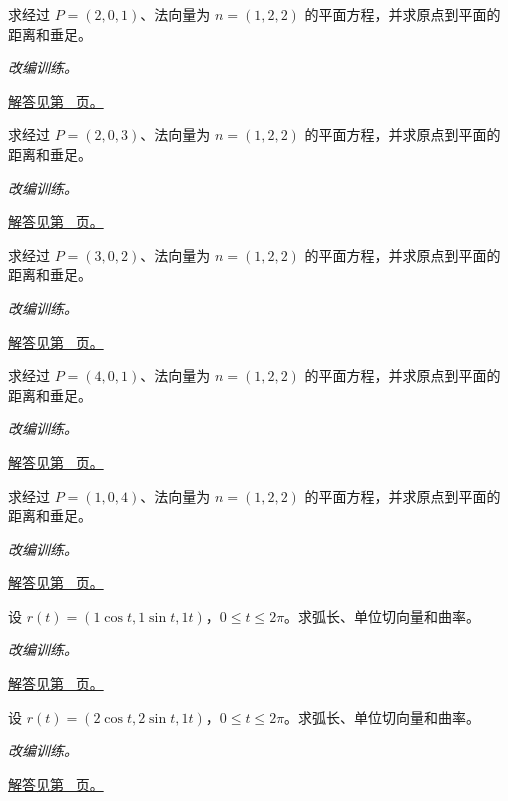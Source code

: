 \documentclass[12pt,fontset=fandol]{ctexart}
\begin{document}
\begin{example}[平面方程与点面距离]\label{ex:c31q8}
求经过 $P=(2,0,1)$、法向量为 $n=(1,2,2)$ 的平面方程，并求原点到平面的距离和垂足。
\par\textit{改编训练。}\par\hyperref[ans:c31q8]{解答见第~\pageref{ans:c31q8} 页。}
\end{example}
\begin{example}[平面方程与点面距离]\label{ex:c31q9}
求经过 $P=(2,0,3)$、法向量为 $n=(1,2,2)$ 的平面方程，并求原点到平面的距离和垂足。
\par\textit{改编训练。}\par\hyperref[ans:c31q9]{解答见第~\pageref{ans:c31q9} 页。}
\end{example}
\begin{example}[平面方程与点面距离]\label{ex:c31q10}
求经过 $P=(3,0,2)$、法向量为 $n=(1,2,2)$ 的平面方程，并求原点到平面的距离和垂足。
\par\textit{改编训练。}\par\hyperref[ans:c31q10]{解答见第~\pageref{ans:c31q10} 页。}
\end{example}
\begin{example}[平面方程与点面距离]\label{ex:c31q11}
求经过 $P=(4,0,1)$、法向量为 $n=(1,2,2)$ 的平面方程，并求原点到平面的距离和垂足。
\par\textit{改编训练。}\par\hyperref[ans:c31q11]{解答见第~\pageref{ans:c31q11} 页。}
\end{example}
\begin{example}[平面方程与点面距离]\label{ex:c31q12}
求经过 $P=(1,0,4)$、法向量为 $n=(1,2,2)$ 的平面方程，并求原点到平面的距离和垂足。
\par\textit{改编训练。}\par\hyperref[ans:c31q12]{解答见第~\pageref{ans:c31q12} 页。}
\end{example}
\begin{example}[圆柱螺线的弧长与曲率]\label{ex:c31q13}
设 $r(t)=(1\cos t,1\sin t,1t)$，$0\le t\le2\pi$。求弧长、单位切向量和曲率。
\par\textit{改编训练。}\par\hyperref[ans:c31q13]{解答见第~\pageref{ans:c31q13} 页。}
\end{example}
\begin{example}[圆柱螺线的弧长与曲率]\label{ex:c31q14}
设 $r(t)=(2\cos t,2\sin t,1t)$，$0\le t\le2\pi$。求弧长、单位切向量和曲率。
\par\textit{改编训练。}\par\hyperref[ans:c31q14]{解答见第~\pageref{ans:c31q14} 页。}
\end{example}
\end{document}
